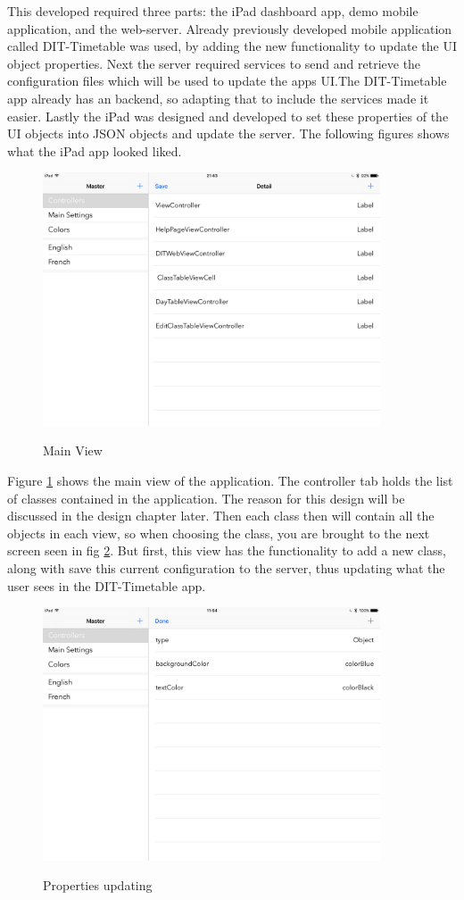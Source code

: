 This developed required three parts: the iPad dashboard app, demo mobile application, and the web-server. Already previously developed mobile application called DIT-Timetable was used, by adding the new functionality to update the UI object properties. Next the server required services to send and retrieve the configuration files which will be used to update the apps UI.The DIT-Timetable app already has an backend, so adapting that to include the services made it easier. Lastly the iPad was designed and developed to set these properties of the UI objects into JSON objects and update the server. The following figures shows what the iPad app looked liked.

\newpage
\begin{figure}[!h]
    \caption{Main View}
    \centering
    \includegraphics[width=100mm]{images/ipad-images/mainview}
    \label{fig:mainview}
\end{figure}

Figure \ref{fig:mainview} shows the main view of the application. The controller tab holds the list of classes contained in the application. The reason for this design will be discussed in the design chapter later. Then each class then will contain all the objects in each view, so when choosing the class, you are brought to the next screen seen in fig \ref{fig:update-config}. But first, this view has the functionality to add a new class, along with save this current configuration to the server, thus updating what the user sees in the DIT-Timetable app.

\begin{figure}[h]
    \caption{Properties updating}
    \centering
    \includegraphics[width=100mm]{images/ipad-images/update}
    \label{fig:update-config}
\end{figure}

